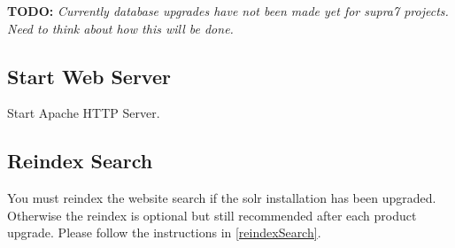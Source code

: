\documentclass[12pt]{article}
\newcommand{\vigShowNotes}{1}
\newcommand{\todo}[1]{
\textbf{TODO:} 
\textit{#1}
}
\begin{document}
\todo{Currently database upgrades have not been made yet for supra7 projects. Need to think about how this will be done.}

\subsection{Start Web Server}
Start Apache HTTP Server.

\subsection{Reindex Search}

You must reindex the website search if the solr installation has been upgraded. Otherwise the reindex is optional but still recommended after each product upgrade. Please follow the instructions in \ref{reindexSearch}.
\end{document}
